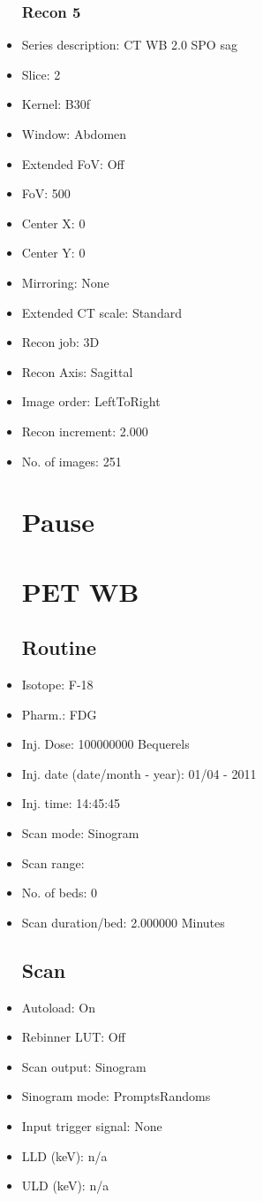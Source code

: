 \documentclass[12pt]{article}
\begin{document}
\begin{itemize}
\subsubsection{Recon 5}
\item Series description: CT WB 2.0 SPO sag
\item Slice: 2
\item Kernel: B30f
\item Window: Abdomen
\item Extended FoV: Off
\item FoV: 500
\item Center X: 0
\item Center Y: 0
\item Mirroring: None
\item Extended CT scale: Standard
\item Recon job: 3D
\item Recon Axis: Sagittal
\item Image order: LeftToRight
\item Recon increment: 2.000
\item No. of images: 251
\section{Pause}
\section{PET WB}\subsection{Routine}
\item Isotope: F-18
\item Pharm.: FDG
\item Inj. Dose: 100000000 Bequerels
\item Inj. date (date/month - year): 01/04 - 2011
\item Inj. time: 14:45:45
\item Scan mode: Sinogram
\item Scan range: 
\item No. of beds: 0
\item Scan duration/bed: 2.000000 Minutes
\subsection{Scan}
\item Autoload: On
\item Rebinner LUT: Off
\item Scan output: Sinogram
\item Sinogram mode: PromptsRandoms
\item Input trigger signal: None
\item LLD (keV): n/a
\item ULD (keV): n/a

\end{itemize}
\end{document}
